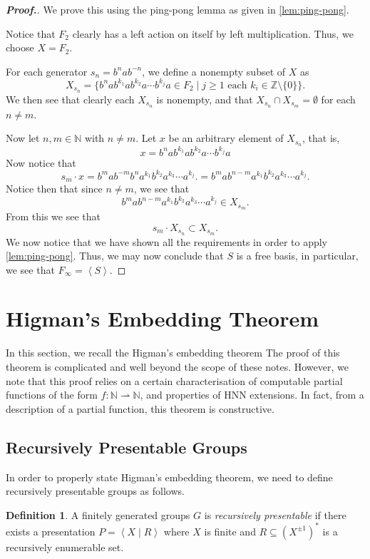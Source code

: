 \documentclass[11pt,a4paper,reqno]{amsart}
\theoremstyle{plain}
\theoremstyle{definition}
\newtheorem{definition}[theorem]{Definition}
\theoremstyle{definition}
\renewcommand\geq\geqslant
\newenvironment{myproof}{\begin{proof}[\normalfont\bfseries Proof.]}{\end{proof}}
\begin{document}
\begin{myproof}
	We prove this using the ping-pong lemma as given in \cref{lem:ping-pong}.

	Notice that $F_2$ clearly has a left action on itself by left multiplication.
	Thus, we choose $X = F_2$.

	For each generator $s_n = b^n a b^{-n}$, we define a nonempty subset of $X$ as
	\[
		X_{s_n} = \{
		b^n a b^{k_1} a b^{k_2} a \cdots b^{k_j} a \in F_2
		\mid
		j \geq 1
		\text{ each }k_i \in \mathbb Z \setminus \{0\}
		\}.
	\]
	We then see that clearly each $X_{s_n}$ is nonempty, and that $X_{s_n}\cap X_{s_{m}} = \emptyset$ for each $n\neq m$.

	Now let $n,m\in \mathbb N$ with $n\neq m$.
	Let $x$ be an arbitrary element of $X_{s_n}$, that is,
	\[
		x =
		b^n a b^{k_1} a b^{k_2} a \cdots b^{k_j} a
	\]
	Now notice that
	\[
		s_m \cdot x
		=
		b^{m} a b^{-m}
		b^n a^{k_1} b^{k_2} a^{k_3} \cdots a^{k_j}.
		=
		b^{m} a b^{n-m} a^{k_1} b^{k_2} a^{k_3} \cdots a^{k_j}.
	\]
	Notice then that since $n\neq m$, we see that
	\[
		b^{m} a b^{n-m} a^{k_1} b^{k_2} a^{k_3} \cdots a^{k_j} \in X_{s_m}.
	\]
	From this we see that
	\[
		s_m \cdot X_{s_n} \subset X_{s_m}.
	\]
	We now notice that we have shown all the requirements in order to apply \cref{lem:ping-pong}.
	Thus, we may now conclude that $S$ is a free basis, in particular, we see that $F_\infty = \left\langle S \right\rangle$.
\end{myproof}
\section{Higman's Embedding Theorem}

In this section, we recall the Higman's embedding theorem
The proof of this theorem is complicated and well beyond the scope of these notes.
However, we note that this proof relies on a certain characterisation of computable partial functions of the form $f\colon \mathbb N \rightharpoonup \mathbb N$, and properties of HNN extensions.
In fact, from a description of a partial function, this theorem is constructive.

\subsection{Recursively Presentable Groups}

In order to properly state Higman's embedding theorem, we need to define recursively presentable groups as follows.

\begin{definition}
  A finitely generated groups $G$ is \emph{recursively presentable} if there exists a presentation $P= \left\langle X\mid R\right\rangle$ where $X$ is finite and $R \subseteq (X^{\pm 1})^*$ is a recursively enumerable set.
\end{definition}
\end{document}
